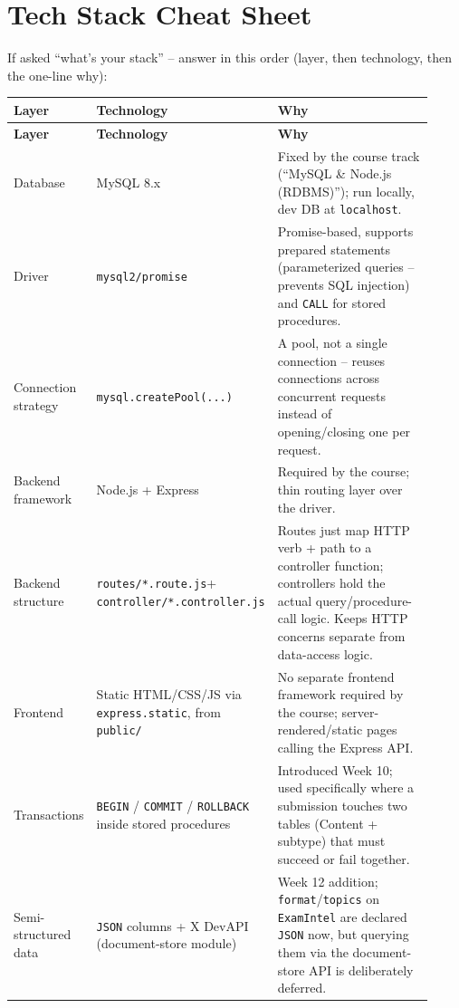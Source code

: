 \documentclass[11pt]{article}
\begin{document}
\section{Tech Stack Cheat Sheet}

If asked ``what's your stack'' -- answer in this order (layer, then technology, then the one-line why):

\begin{longtable}{@{}p{0.17\linewidth} p{0.24\linewidth} p{0.51\linewidth}@{}}
\toprule
\textbf{Layer} & \textbf{Technology} & \textbf{Why} \\
\midrule
\endfirsthead
\toprule
\textbf{Layer} & \textbf{Technology} & \textbf{Why} \\
\midrule
\endhead
\bottomrule
\endfoot
Database & MySQL 8.x & Fixed by the course track (``MySQL \& Node.js (RDBMS)''); run locally, dev DB at \texttt{localhost}. \\[4pt]
Driver & \texttt{mysql2/promise} & Promise-based, supports prepared statements (parameterized queries -- prevents SQL injection) and \texttt{CALL} for stored procedures. \\[4pt]
Connection strategy & \texttt{mysql.createPool(...)} & A pool, not a single connection -- reuses connections across concurrent requests instead of opening/closing one per request. \\[4pt]
Backend framework & Node.js + Express & Required by the course; thin routing layer over the driver. \\[4pt]
Backend structure & \texttt{routes/*.route.js}\newline + \texttt{controller/*.\allowbreak controller.js} & Routes just map HTTP verb + path to a controller function; controllers hold the actual query/procedure-call logic. Keeps HTTP concerns separate from data-access logic. \\[4pt]
Frontend & Static HTML/CSS/JS via \texttt{express.static}, from \texttt{public/} & No separate frontend framework required by the course; server-rendered/static pages calling the Express API. \\[4pt]
Transactions & \texttt{BEGIN} / \texttt{COMMIT} / \texttt{ROLLBACK} inside stored procedures & Introduced Week 10; used specifically where a submission touches two tables (Content + subtype) that must succeed or fail together. \\[4pt]
Semi-structured data & \texttt{JSON} columns + X DevAPI (document-store module) & Week 12 addition; \texttt{format}/\texttt{topics} on \texttt{ExamIntel} are declared \texttt{JSON} now, but querying them via the document-store API is deliberately deferred. \\
\end{longtable}
\end{document}
